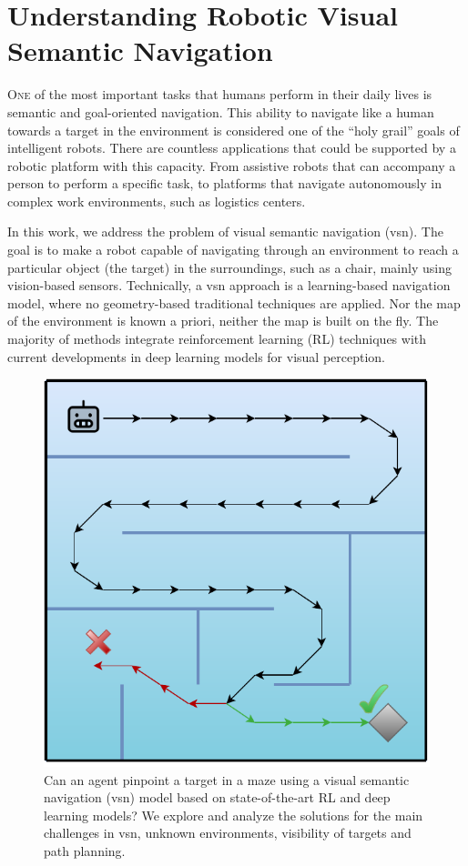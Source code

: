 \chapter{Understanding Robotic Visual Semantic Navigation}\label{ch:understanding-robotic-visual-semantic-navigation}

\lettrine{\textcolor{accent_color}{O}}{ne} of the most important tasks that humans perform in their daily lives is semantic and goal-oriented navigation.
This ability to navigate like a human towards a target in the environment is considered one of the ``holy grail'' goals of intelligent robots.
There are countless applications that could be supported by a robotic platform with this capacity.
From assistive robots that can accompany a person to perform a specific task, to platforms that navigate autonomously in complex work environments, such as logistics centers.

In this work, we address the problem of visual semantic navigation (\acrshort{vsn}).
The goal is to make a robot capable of navigating through an environment to reach a particular object (the target) in the surroundings, such as a chair, mainly using vision-based sensors.
Technically, a \acrshort{vsn} approach is a learning-based navigation model, where no geometry-based traditional techniques are applied.
Nor the map of the environment is known a priori, neither the map is built on the fly.
The majority of methods integrate reinforcement learning (RL) techniques with current developments in deep learning models for visual perception.

\begin{figure}
  \centering
   \includegraphics[width=0.6\linewidth]{figures/understanding_vsn/graphical_abstract}
   \caption{Can an agent pinpoint a target in a maze using a visual semantic navigation (\acrshort{vsn}) model based on state-of-the-art RL and deep learning models? We explore and analyze the solutions for the main challenges in \acrshort{vsn}, \ie unknown environments, visibility of targets and path planning.}
   \label{fig:graphical_abstract}
\end{figure}

